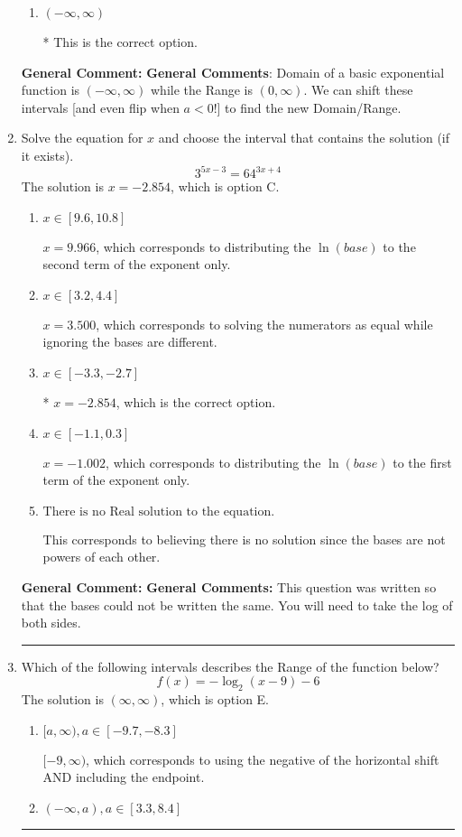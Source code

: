 \documentclass{extbook}[14pt]
\newcommand{\litem}[1]{\item #1

\rule{\textwidth}{0.4pt}}
\begin{document}
\begin{enumerate}
{\begin{enumerate}[label=\Alph*.]
$(-1, \infty)$, which corresponds to using the negative vertical shift AND flipping the Range interval.
\item \( (-\infty, \infty) \)

* This is the correct option.
\end{enumerate}

\textbf{General Comment:} \textbf{General Comments}: Domain of a basic exponential function is $(-\infty, \infty)$ while the Range is $(0, \infty)$. We can shift these intervals [and even flip when $a<0$!] to find the new Domain/Range.
}
\litem{
Solve the equation for $x$ and choose the interval that contains the solution (if it exists).
\[ 3^{5x-3} = 64^{3x+4} \]
The solution is \( x = -2.854 \), which is option C.\begin{enumerate}[label=\Alph*.]
\item \( x \in [9.6, 10.8] \)

$x = 9.966$, which corresponds to distributing the $\ln(base)$ to the second term of the exponent only.
\item \( x \in [3.2, 4.4] \)

$x = 3.500$, which corresponds to solving the numerators as equal while ignoring the bases are different.
\item \( x \in [-3.3, -2.7] \)

* $x = -2.854$, which is the correct option.
\item \( x \in [-1.1, 0.3] \)

$x = -1.002$, which corresponds to distributing the $\ln(base)$ to the first term of the exponent only.
\item \( \text{There is no Real solution to the equation.} \)

This corresponds to believing there is no solution since the bases are not powers of each other.
\end{enumerate}

\textbf{General Comment:} \textbf{General Comments:} This question was written so that the bases could not be written the same. You will need to take the log of both sides.
}
\litem{
Which of the following intervals describes the Range of the function below?
\[ f(x) = -\log_2{(x-9)}-6 \]
The solution is \( (\infty, \infty) \), which is option E.\begin{enumerate}[label=\Alph*.]
\item \( [a, \infty), a \in [-9.7, -8.3] \)

$[-9, \infty)$, which corresponds to using the negative of the horizontal shift AND including the endpoint.
\item \( (-\infty, a), a \in [3.3, 8.4] \)


\end{enumerate}}
\end{enumerate}
\end{document}

